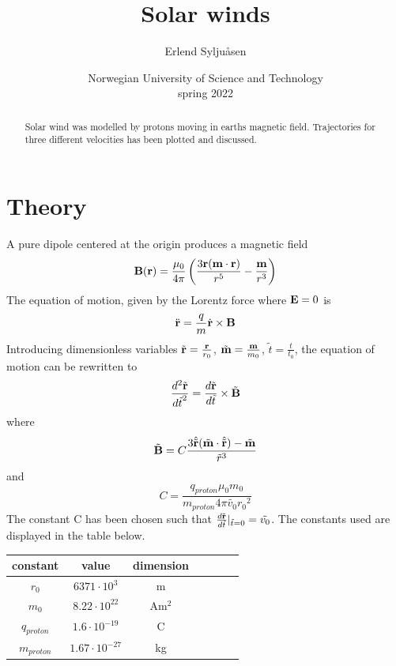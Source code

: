 \documentclass[11pt]{article}
\begin{document}
\title{\textbf{\Huge Solar winds}}
\author{Erlend Syljuåsen}
\date{Norwegian University of Science and Technology\\spring 2022}
\maketitle

\begin{abstract}
\begin{center}
Solar wind was modelled by protons moving in earths magnetic field. Trajectories for three different velocities has been plotted and discussed.
\end{center}
\end{abstract}

\section{Theory}
A pure dipole centered at the origin produces a magnetic field
$$\vectorbold{B}(\vectorbold{r}) = \frac{\mu_0}{4\pi} \left(\frac{3\vectorbold{r}(\vectorbold{m} \cdot \vectorbold{r})}{r^5} - \frac{\vectorbold{m}}{r^3}\right)$$
The equation of motion, given by the Lorentz force where $\vectorbold{E} = 0$ is 
$$\ddot{\vectorbold{r}} = \frac{q}{m} \dot{\vectorbold{r}} \times \vectorbold{B}$$
Introducing dimensionless variables $\tilde{\vectorbold{r}}= \frac{\vectorbold{r}}{r_0}$, $\tilde{\vectorbold{m}} = \frac{\vectorbold{m}}{m_0}$, $\tilde{t}= \frac{t}{t_0}$, the equation of motion can be rewritten to
\begin{equation}
    \frac{d^2 \tilde{\vectorbold{r}}}{{d\tilde{t}}^2} = \frac{d\tilde{\vectorbold{r}}}{d\tilde{t}} \times \tilde{\vectorbold{B}}
    \label{eq:diff}
\end{equation}
where $$\tilde{\vectorbold{B}} = C\frac{3 \hat{\tilde{\vectorbold{r}}} (\tilde{\vectorbold{m}} \cdot \hat{\tilde{\vectorbold{r}}}) - \tilde{\vectorbold{m}}}{{\tilde{r}}^3}$$ 
and $$ C = \frac{q_{proton}\mu_0 m_0}{m_{proton} 4 \pi \tilde{v_0} {r_0}^2}$$
The constant C has been chosen such that $\frac{d\tilde{\vectorbold{r}}}{d\tilde{t}}|_{\tilde{t}=0}= \tilde{v_0}$. The constants used are displayed in the table below.
\begin{center}
\begin{tabular}{|c|c|c|c|c|c|c|}
\hline
    constant & value & dimension\\
\hline
    $r_0$ & $6371 \cdot 10^3$ & m\\ 
    $m_0$ & $8.22 \cdot 10^{22}$ & Am$^2$\\ 
    $q_{proton}$ & $1.6 \cdot 10^{-19}$ & C\\
    $m_{proton}$ & $1.67 \cdot 10^{-27}$ & kg\\
\hline
\end{tabular}
\label{table:constants}
\end{center}
\end{document}
